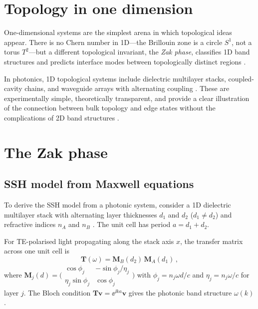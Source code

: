 
\section{Topology in one dimension}
\label{sec:ch14-1d-topology}

One-dimensional systems are the simplest arena in which topological
ideas appear.  There is no Chern number in 1D---the Brillouin zone is a
circle $S^1$, not a torus $T^2$---but a different topological invariant,
the \emph{Zak phase}, classifies 1D band structures and predicts
interface modes between topologically distinct regions
\cite{kane2005sub,initio2026pdf}.

In photonics, 1D topological systems include dielectric multilayer
stacks, coupled-cavity chains, and waveguide arrays with alternating
coupling \cite{ozawa2018topological,press2026photonic}.  These are experimentally simple, theoretically transparent,
and provide a clear illustration of the connection between bulk topology
and edge states without the complications of 2D band structures \cite{stjean2017lasinga,stjean2017lasing}.

\section{The Zak phase}
\label{sec:ch14-zak}

\subsection{SSH model from Maxwell equations}
\label{sec:ch14-ssh-maxwell}

To derive the SSH model from a photonic system, consider a 1D
dielectric multilayer stack with alternating layer thicknesses
$d_1$ and $d_2$ ($d_1\neq d_2$) and refractive indices $n_A$ and
$n_B$
\cite{hsieh2008topological}.  The unit cell has period $a=d_1+d_2$.

For TE-polarised light propagating along the stack axis $x$, the
transfer matrix across one unit cell is
\begin{equation}\label{eq:ch14-transfer}
  \mathbf{T}(\omega) = \mathbf{M}_B(d_2)\,\mathbf{M}_A(d_1)\,,
\end{equation}
where
$\mathbf{M}_j(d) = \bigl(\begin{smallmatrix}
  \cos\phi_j & -\sin\phi_j/\eta_j \\
  \eta_j\sin\phi_j & \cos\phi_j
\end{smallmatrix}\bigr)$
with $\phi_j=n_j\omega d/c$ and $\eta_j=n_j\omega/c$ for layer $j$.
The Bloch condition $\mathbf{T}\mathbf{v}=\ee^{\ii ka}\mathbf{v}$
gives the photonic band structure $\omega(k)$.

